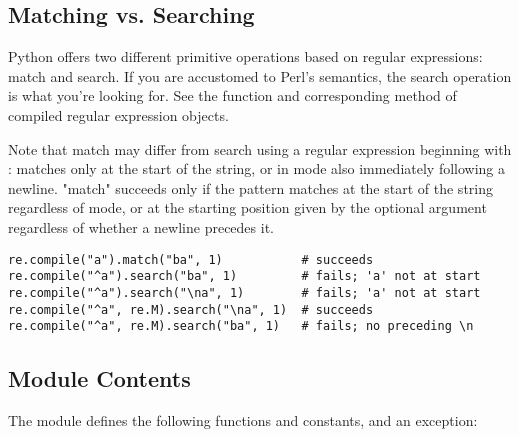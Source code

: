 \subsection{Matching vs. Searching \label{matching-searching}}


Python offers two different primitive operations based on regular
expressions: match and search.  If you are accustomed to Perl's
semantics, the search operation is what you're looking for.  See the
 function and corresponding method of compiled
regular expression objects.

Note that match may differ from search using a regular expression
beginning with \character{\^}:  \character{\^} matches only at the start
of the string, or in  mode also immediately
following a newline.  "match" succeeds only if the pattern matches at
the start of the string regardless of mode, or at the starting
position given by the optional  argument regardless of
whether a newline precedes it.

\begin{verbatim}
re.compile("a").match("ba", 1)           # succeeds
re.compile("^a").search("ba", 1)         # fails; 'a' not at start
re.compile("^a").search("\na", 1)        # fails; 'a' not at start
re.compile("^a", re.M).search("\na", 1)  # succeeds
re.compile("^a", re.M).search("ba", 1)   # fails; no preceding \n
\end{verbatim}


\subsection{Module Contents}

The module defines the following functions and constants, and an exception:


